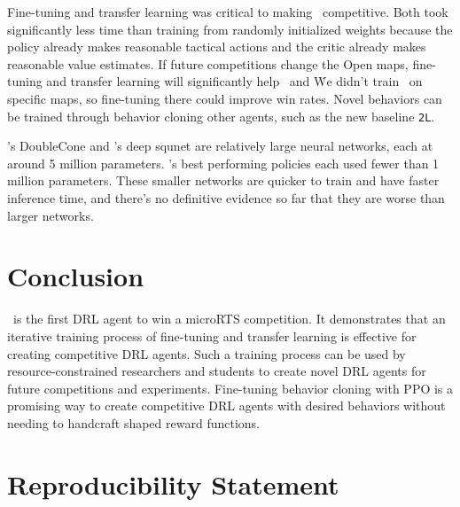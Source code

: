 \documentclass{article}
\begin{document}
Fine-tuning and transfer learning was critical to making \agentName\ competitive. Both
took significantly less time than training from randomly initialized weights because the
policy already makes reasonable tactical actions and the critic already makes
reasonable value estimates. If future competitions change the Open maps, fine-tuning and transfer learning
will significantly help \agentName\ and \bcPPOAgent\. We didn't train \bcPPOAgent\ on
specific maps, so fine-tuning there could improve win rates. Novel behaviors can be
trained through behavior cloning other agents, such as the new baseline \texttt{2L}.

\agentName's DoubleCone and \bcPPOAgent's deep squnet are relatively large neural
networks, each at around 5 million parameters.
\citet{DBLP:journals/corr/abs-2105-13807}'s best performing policies each used fewer
than 1 million parameters. These smaller networks are quicker to train and have faster
inference time, and there's no definitive evidence so far that they are worse than
larger networks.

\section{Conclusion}
\agentName\ is the first DRL agent to win a microRTS competition. It demonstrates that an
iterative training process of fine-tuning and transfer learning is effective for
creating competitive DRL agents. Such a training process can be used by 
resource-constrained researchers and students to create novel DRL agents for future 
competitions and experiments. Fine-tuning behavior cloning with PPO is a promising way
to create competitive DRL agents with desired behaviors without needing to handcraft
shaped reward functions.

\section{Reproducibility Statement}





\clearpage

\appendix
\end{document}

